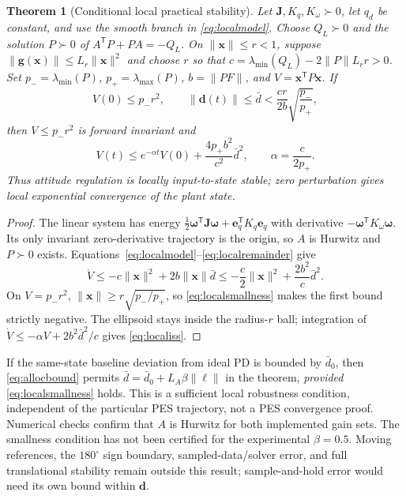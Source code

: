 \documentclass[letterpaper, 10 pt, conference]{ieeeconf}
\newtheorem{theorem}{Theorem}
\newcommand{\T}{^{\mathsf T}}
\begin{document}
\begin{theorem}[Conditional local practical stability]
\label{thm:local}
Let $\bm J,K_q,K_\omega\succ0$, let $q_d$ be constant, and use the smooth
branch in \eqref{eq:localmodel}. Choose $Q_L\succ0$ and the solution
$P\succ0$ of $A\T P+PA=-Q_L$. On $\|\bm x\|\le r<1$, suppose
$\|\bm g(\bm x)\|\le L_r\|\bm x\|^2$ and choose $r$ so that
$c=\lambda_{\min}(Q_L)-2\|P\|L_r r>0$.
Set $p_- =\lambda_{\min}(P)$, $p_+=\lambda_{\max}(P)$,
$b=\|PF\|$, and $V=\bm x\T P\bm x$. If
\begin{equation}
 V(0)\le p_-r^2,\qquad
 \|\bm d(t)\|\le\bar d<\frac{cr}{2b}\sqrt{\frac{p_-}{p_+}},
 \label{eq:localsmallness}
\end{equation}
then $V\le p_-r^2$ is forward invariant and
\begin{equation}
 V(t)\le e^{-\alpha t}V(0)+\frac{4p_+b^2}{c^2}\bar d^2,
 \qquad \alpha=\frac{c}{2p_+}.
 \label{eq:localiss}
\end{equation}
Thus attitude regulation is locally input-to-state stable; zero
perturbation gives local exponential convergence of the plant state.
\end{theorem}
\begin{proof}
The linear system has energy
$\frac12\bm\omega\T\bm J\bm\omega+\bm e_q\T K_q\bm e_q$ with derivative
$-\bm\omega\T K_\omega\bm\omega$. Its only invariant zero-derivative
trajectory is the origin, so $A$ is Hurwitz and $P\succ0$ exists.
Equations~\eqref{eq:localmodel}--\eqref{eq:localremainder} give
\[
 \dot V\le-c\|\bm x\|^2+2b\|\bm x\|\bar d
 \le-\frac c2\|\bm x\|^2+\frac{2b^2}{c}\bar d^2.
\]
On $V=p_-r^2$, $\|\bm x\|\ge r\sqrt{p_-/p_+}$, so
\eqref{eq:localsmallness} makes the first bound strictly negative.
The ellipsoid stays inside the radius-$r$ ball; integration of
$\dot V\le-\alpha V+2b^2\bar d^2/c$ gives \eqref{eq:localiss}.
\end{proof}

If the same-state baseline deviation from ideal PD is bounded by $\bar d_0$,
then \eqref{eq:allocbound} permits
$\bar d=\bar d_0+L_A\beta\|\bm\ell\|$ in the theorem, \emph{provided}
\eqref{eq:localsmallness} holds. This is a sufficient local robustness
condition, independent of the particular PES trajectory, not a PES
convergence proof. Numerical checks confirm that $A$ is Hurwitz for both
implemented gain sets. The smallness condition has not been certified
for the experimental $\beta=0.5$. Moving references, the $180^\circ$
sign boundary, sampled-data/solver error, and full translational stability
remain outside this result; sample-and-hold error would need its own
bound within $\bm d$.
\end{document}
